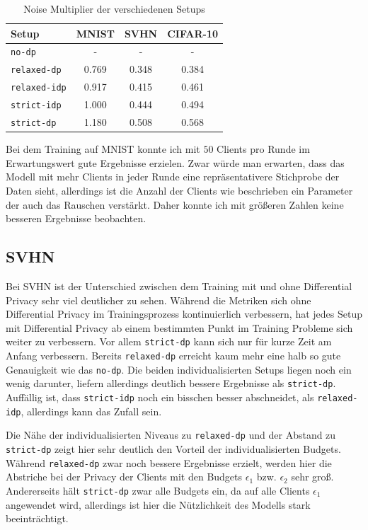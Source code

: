 \begin{table}
	\centering
	\begin{tabular}{lccc}
		\toprule
		Setup & MNIST & SVHN & CIFAR-10 \\
		\midrule
		\texttt{no-dp} & - & - & - \\
		\texttt{relaxed-dp} & 0.769 & 0.348 & 0.384 \\
		\texttt{relaxed-idp} & 0.917 & 0.415 & 0.461 \\
		\texttt{strict-idp} & 1.000 & 0.444 & 0.494 \\
		\texttt{strict-dp} & 1.180 & 0.508 & 0.568 \\
		\bottomrule
	\end{tabular}
	\caption{Noise Multiplier der verschiedenen Setups}
	\label{tab:noise-multipliers}
\end{table}

Bei dem Training auf MNIST konnte ich mit $50$ Clients pro Runde im Erwartungswert gute Ergebnisse erzielen. Zwar würde man erwarten, dass das Modell mit mehr Clients in jeder Runde eine repräsentativere Stichprobe der Daten sieht, allerdings ist die Anzahl der Clients wie beschrieben ein Parameter der auch das Rauschen verstärkt. Daher konnte ich mit größeren Zahlen keine besseren Ergebnisse beobachten.

\subsection{SVHN}

Bei SVHN ist der Unterschied zwischen dem Training mit und ohne Differential Privacy sehr viel deutlicher zu sehen. Während die Metriken sich ohne Differential Privacy im Trainingsprozess kontinuierlich verbessern, hat jedes Setup mit Differential Privacy ab einem bestimmten Punkt im Training Probleme sich weiter zu verbessern. Vor allem \texttt{strict-dp} kann sich nur für kurze Zeit am Anfang verbessern. Bereits \texttt{relaxed-dp} erreicht kaum mehr eine halb so gute Genauigkeit wie das \texttt{no-dp}. Die beiden individualisierten Setups liegen noch ein wenig darunter, liefern allerdings deutlich bessere Ergebnisse als \texttt{strict-dp}. Auffällig ist, dass \texttt{strict-idp} noch ein bisschen besser abschneidet, als \texttt{relaxed-idp}, allerdings kann das Zufall sein.

Die Nähe der individualisierten Niveaus zu \texttt{relaxed-dp} und der Abstand zu \texttt{strict-dp} zeigt hier sehr deutlich den Vorteil der individualisierten Budgets. Während \texttt{relaxed-dp} zwar noch bessere Ergebnisse erzielt, werden hier die Abstriche bei der Privacy der Clients mit den Budgets $\epsilon_1$ bzw. $\epsilon_2$ sehr groß. Andererseits hält \texttt{strict-dp} zwar alle Budgets ein, da auf alle Clients $\epsilon_1$ angewendet wird, allerdings ist hier die Nützlichkeit des Modells stark beeinträchtigt.

